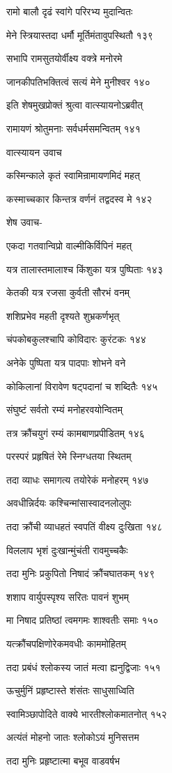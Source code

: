 रामो बालौ दृढं स्वांगे परिरभ्य मुदान्वितः

मेने स्त्रियास्तदा धर्मौ मूर्तिमंतावुपस्थितौ १३९

सभापि रामसुतयोर्वीक्ष्य वक्त्रे मनोरमे

जानकीपतिभक्तित्वं सत्यं मेने मुनीश्वर १४०

इति शेषमुखप्रोक्तं श्रुत्वा वात्स्यायनोऽब्रवीत्

रामायणं श्रोतुमनाः सर्वधर्मसमन्वितम् १४१

वात्स्यायन उवाच

कस्मिन्काले कृतं स्वामिन्रामायणमिदं महत्

कस्माच्चकार किन्तत्र वर्णनं तद्वदस्व मे १४२

शेष उवाच-

एकदा गतवान्विप्रो वाल्मीकिर्विपिनं महत्

यत्र तालास्तमालाश्च किंशुका यत्र पुष्पिताः १४३

केतकी यत्र रजसा कुर्वती सौरभं वनम्

शशिप्रभेव महती दृश्यते शुभ्रकर्णभृत्

चंपकोबकुलश्चापि कोविदारः कुरंटकः १४४

अनेके पुष्पिता यत्र पादपाः शोभने वने

कोकिलानां विरावेण षट्पदानां च शब्दितैः १४५

संघुष्टं सर्वतो रम्यं मनोहरवयोन्वितम्

तत्र क्रौंचयुगं रम्यं कामबाणप्रपीडितम् १४६

परस्परं प्रहृषितं रेमे स्निग्धतया स्थितम्

तदा व्याधः समागत्य तयोरेकं मनोहरम् १४७

अवधीन्निर्दयः कश्चिन्मांसास्वादनलोलुपः

तदा क्रौंची व्याधहतं स्वपतिं वीक्ष्य दुःखिता १४८

विललाप भृशं दुःखान्मुंचंती रावमुच्चकैः

तदा मुनिः प्रकुपितो निषादं क्रौंचघातकम् १४९

शशाप वार्युपस्पृश्य सरितः पावनं शुभम्

मा निषाद प्रतिष्ठां त्वमगमः शाश्वतीः समाः १५०

यत्क्रौंचपक्षिणोरेकमवधीः काममोहितम्

तदा प्रबंधं श्लोकस्य जातं मत्वा ह्यनुद्विजाः १५१

ऊचुर्मुनिं प्रहृष्टास्ते शंसंतः साधुसाध्विति

स्वामिञ्छापोदिते वाक्ये भारतीश्लोकमातनोत् १५२

अत्यंतं मोहनो जातः श्लोकोऽयं मुनिसत्तम

तदा मुनिः प्रहृष्टात्मा बभूव वाडवर्षभ


